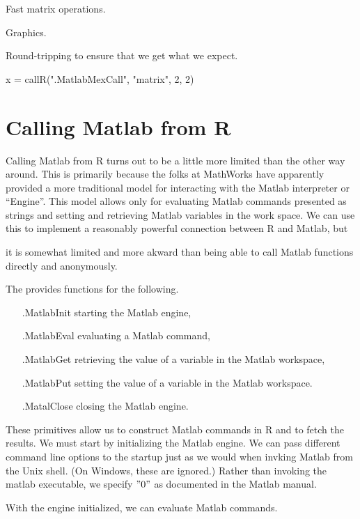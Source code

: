 \documentclass{article}
\begin{document}
Fast matrix operations.

Graphics.

Round-tripping to ensure that we get what we expect.

x = callR(".MatlabMexCall", "matrix", 2, 2)



\section{Calling Matlab from R}

Calling Matlab from R turns out to be a little more limited than the
other way around.  This is primarily because the folks at MathWorks
have apparently provided a more traditional model for interacting with
the Matlab interpreter or ``Engine''.  This model allows only for
evaluating Matlab commands presented as strings and setting and
retrieving Matlab variables in the work space.  We can use this to
implement a reasonably powerful connection between R and Matlab, but

it is somewhat limited and more akward than being able to call Matlab
functions directly and anonymously.

The  provides functions
for  the following.
\begin{itemize}
\item[.MatlabInit] starting the Matlab engine,
\item[.MatlabEval] evaluating a Matlab command,
\item[.MatlabGet] retrieving the value of a
variable in the Matlab  workspace,
\item[.MatlabPut] setting the value of a
variable in the Matlab workspace.
\item[.MatalClose] closing the  Matlab engine.
\end{itemize}

These primitives allow us to construct Matlab commands in R and to
fetch the results.  We must start by initializing the Matlab engine.
We can pass different command line options to the startup just as we
would when invking Matlab from the Unix shell.  (On Windows, these are
ignored.)  Rather than invoking the matlab executable, we specify
$"\\0"$ as documented in the Matlab manual\cite{MatlabExternalManual}.

With the engine initialized, we can evaluate Matlab commands.
\end{document}
